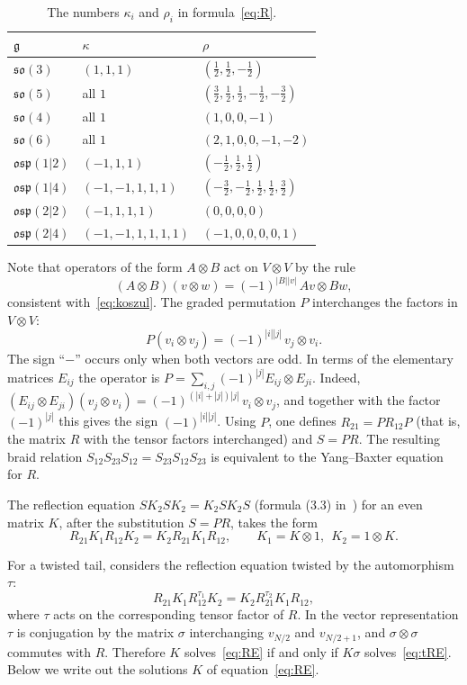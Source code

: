 \documentclass[12pt,a4paper]{article}
\newcommand{\g}{\mathfrak{g}}
\newcommand{\so}{\mathfrak{so}}
\newcommand{\osp}{\mathfrak{osp}}
\newcommand{\ot}{\otimes}
\begin{document}
\begin{table}[H]
\centering\small
\renewcommand{\arraystretch}{1.2}
\begin{tabular}{@{}lll@{}}
\toprule
$\g$ & $\kappa$ & $\rho$\\
\midrule
$\so(3)$ & $(1,1,1)$ & $(\tfrac12,\tfrac12,-\tfrac12)$\\
$\so(5)$ & all $1$ & $(\tfrac32,\tfrac12,\tfrac12,-\tfrac12,-\tfrac32)$\\
$\so(4)$ & all $1$ & $(1,0,0,-1)$\\
$\so(6)$ & all $1$ & $(2,1,0,0,-1,-2)$\\
$\osp(1|2)$ & $(-1,1,1)$ & $(-\tfrac12,\tfrac12,\tfrac12)$\\
$\osp(1|4)$ & $(-1,-1,1,1,1)$ & $(-\tfrac32,-\tfrac12,\tfrac12,\tfrac12,\tfrac32)$\\
$\osp(2|2)$ & $(-1,1,1,1)$ & $(0,0,0,0)$\\
$\osp(2|4)$ & $(-1,-1,1,1,1,1)$ & $(-1,0,0,0,0,1)$\\
\bottomrule
\end{tabular}
\caption{The numbers $\kappa_i$ and $\rho_i$ in formula~\eqref{eq:R}.}\label{t:kr}
\end{table}

Note that operators of the form $A\ot B$ act on $V\ot V$ by the rule
\[
(A\ot B)(v\ot w)=(-1)^{|B||v|}\,Av\ot Bw ,
\]
consistent with~\eqref{eq:koszul}. The graded permutation $P$ interchanges the factors in $V\ot V$:
\[
P(v_i\ot v_j)=(-1)^{|i||j|}\,v_j\ot v_i .
\]
The sign ``$-$'' occurs only when both vectors are odd. In terms of the elementary matrices $E_{ij}$ the operator is $P=\sum_{i,j}(-1)^{|j|}E_{ij}\ot E_{ji}$.
Indeed, $(E_{ij}\ot E_{ji})(v_j\ot v_i)=(-1)^{(|i|+|j|)|j|}\,v_i\ot v_j$, and together with the factor $(-1)^{|j|}$
this gives the sign $(-1)^{|i||j|}$. Using $P$, one defines $R_{21}=PR_{12}P$ (that is, the matrix $R$ with the tensor factors interchanged) and $S=PR$.
The resulting braid relation $S_{12}S_{23}S_{12}=S_{23}S_{12}S_{23}$ is equivalent to the Yang--Baxter equation for $R$.

The reflection equation $SK_2SK_2=K_2SK_2S$ (formula (3.3) in~\cite{AMS}) for an even matrix $K$, after the substitution $S=PR$,
takes the form
\begin{equation}\label{eq:RE}
R_{21}K_1R_{12}K_2=K_2R_{21}K_1R_{12},\qquad K_1=K\ot1,\ \ K_2=1\ot K .
\end{equation}

For a twisted tail, \cite[(3.5)]{AMS} considers the reflection equation twisted by the automorphism $\tau$:
\begin{equation}\label{eq:tRE}
R_{21}K_1R^{\tau_1}_{12}K_2=K_2R^{\tau_2}_{21}K_1R_{12},
\end{equation}
where $\tau$ acts on the corresponding tensor factor of $R$. In the vector representation $\tau$ is conjugation
by the matrix $\sigma$ interchanging $v_{N/2}$ and $v_{N/2+1}$, and $\sigma\ot\sigma$ commutes with $R$. Therefore $K$ solves~\eqref{eq:RE}
if and only if $K\sigma$ solves~\eqref{eq:tRE}. Below we write out the solutions $K$ of equation~\eqref{eq:RE}.
\end{document}
